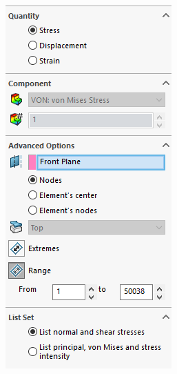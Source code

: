 \documentclass[12pt, letterpaper]{article}
\begin{document}
\begin{figure}[H]
\begin{subfigure}[t]{.3\linewidth}
		\includegraphics[width=\linewidth]{./procedure/stress-list}

\end{subfigure}
\end{figure}
\end{document}
